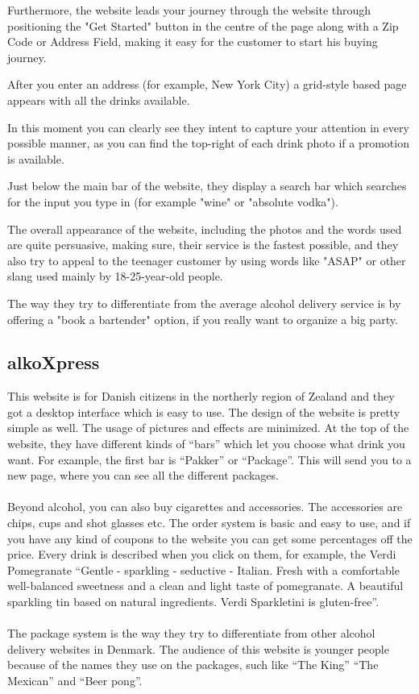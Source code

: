 \documentclass[12p]{article}
\begin{document}
Furthermore, the website leads your journey through the website through positioning the "Get Started" button in the centre of the page along with a Zip Code or Address Field, making it easy for the customer to start his buying journey.

After you enter an address (for example, New York City) a grid-style based page appears with all the drinks available.

In this moment you can clearly see they intent to capture your attention in every possible manner, as you can find the top-right of each drink photo if a promotion is available.

Just below the main bar of the website, they display a search bar which searches for the input you type in (for example "wine" or "absolute vodka").

The overall appearance of the website, including the photos and the words used are quite persuasive, making sure, their service is the fastest possible, and they also try to appeal to the teenager customer by using words like "ASAP" or other slang used mainly by 18-25-year-old people.

The way they try to differentiate from the average alcohol delivery service is by offering a "book a bartender" option, if you really want to organize a big party.

\subsection{alkoXpress \cite{alkoXpress}}
This website is for Danish citizens in the northerly region of Zealand and they got a desktop interface which is easy to use. The design of the website is pretty simple as well. The usage of pictures and effects are minimized. At the top of the website, they have different kinds of “bars” which let you choose what drink you want. For example, the first bar is “Pakker” or “Package”. This will send you to a new page, where you can see all the different packages. 
\\ \\
Beyond alcohol, you can also buy cigarettes and accessories. The accessories are chips, cups and shot glasses etc. The order system is basic and easy to use, and if you have any kind of coupons to the website you can get some percentages off the price. 
Every drink is described when you click on them, for example, the Verdi Pomegranate 
“Gentle - sparkling - seductive - Italian.
Fresh with a comfortable well-balanced sweetness and a clean and light taste of pomegranate.
A beautiful sparkling tin based on natural ingredients.
Verdi Sparkletini is gluten-free”.
\\ \\
The package system is the way they try to differentiate from other alcohol delivery websites in Denmark. The audience of this website is younger people because of the names they use on the packages, such like “The King” “The Mexican” and “Beer pong”. 
\end{document}
